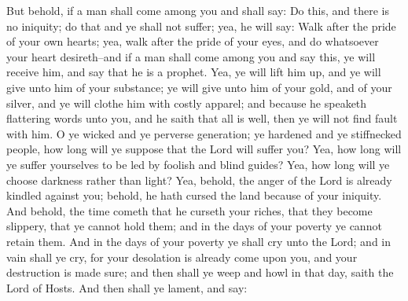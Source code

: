 But behold, if a man shall come among you and shall say: Do this, and there is no iniquity; do that and ye shall not suffer; yea, he will say: Walk after the pride of your own hearts; yea, walk after the pride of your eyes, and do whatsoever your heart desireth--and if a man shall come among you and say this, ye will receive him, and say that he is a prophet.
\bverse \iffalse Yea, ye will lift him up, and ye will give unto him of your substance; ye will give unto him of your gold, and of your silver, and ye will clothe him with costly apparel; and because he speaketh flattering words unto you, and he saith that all is well, then ye will not find fault with him. \fi
Yea, ye will lift him up, and ye will give unto him of your substance; ye will give unto him of your gold, and of your silver, and ye will clothe him with costly apparel; and because he speaketh flattering words unto you, and he saith that all is well, then ye will not find fault with him.
\bverse \iffalse O ye wicked and ye perverse generation; ye hardened and ye stiffnecked people, how long will ye suppose that the Lord will suffer you? Yea, how long will ye suffer yourselves to be led by foolish and blind guides? Yea, how long will ye choose darkness rather than light? \fi
O ye wicked and ye perverse generation; ye hardened and ye stiffnecked people, how long will ye suppose that the Lord will suffer you? Yea, how long will ye suffer yourselves to be led by foolish and blind guides? Yea, how long will ye choose darkness rather than light?
\bverse \iffalse Yea, behold, the anger of the Lord is already kindled against you; behold, he hath cursed the land because of your iniquity. \fi
Yea, behold, the anger of the Lord is already kindled against you; behold, he hath cursed the land because of your iniquity.
\bverse \iffalse And behold, the time cometh that he curseth your riches, that they become slippery, that ye cannot hold them; and in the days of your poverty ye cannot retain them. \fi
And behold, the time cometh that he curseth your riches, that they become slippery, that ye cannot hold them; and in the days of your poverty ye cannot retain them.
\bverse \iffalse And in the days of your poverty ye shall cry unto the Lord; and in vain shall ye cry, for your desolation is already come upon you, and your destruction is made sure; and then shall ye weep and howl in that day, saith the Lord of Hosts. And then shall ye lament, and say: \fi
And in the days of your poverty ye shall cry unto the Lord; and in vain shall ye cry, for your desolation is already come upon you, and your destruction is made sure; and then shall ye weep and howl in that day, saith the Lord of Hosts. And then shall ye lament, and say:
